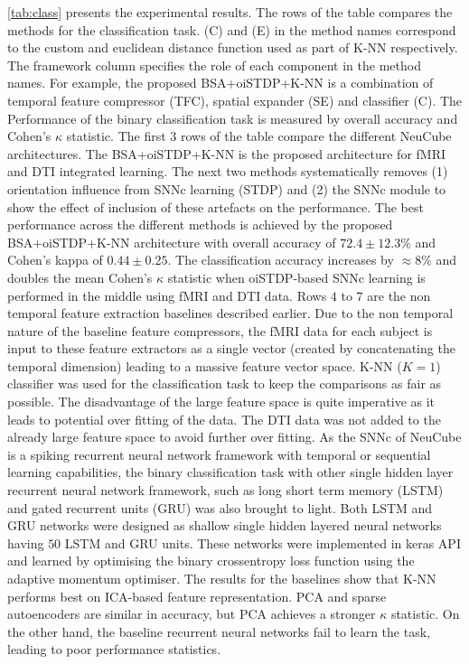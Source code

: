 \tablename \ref{tab:class} presents the experimental results. The rows of the table compares the methods for the classification task. (C) and (E) in the method names correspond to the custom and euclidean distance function used as part of K-NN respectively. The framework column specifies the role of each component in the method names. For example, the proposed BSA+oiSTDP+K-NN is a combination of temporal feature compressor (TFC), spatial expander (SE) and classifier (C). The Performance of the binary classification task is measured by overall accuracy and Cohen's $\kappa$ statistic. The first $3$ rows of the table compare the different NeuCube architectures. The BSA+oiSTDP+K-NN is the proposed architecture for fMRI and DTI integrated learning. The next two methods systematically removes (1) orientation influence from SNNc learning (STDP) and (2) the SNNc module to show the effect of inclusion of these artefacts on the performance. The best performance across the different methods is achieved by the proposed BSA+oiSTDP+K-NN architecture with overall accuracy of $72.4\pm 12.3\%$ and Cohen's kappa of $0.44\pm 0.25$. The classification accuracy increases by $\approx 8\%$ and doubles the mean Cohen's $\kappa$ statistic when oiSTDP-based SNNc learning is performed in the middle using fMRI and DTI data. Rows $4$ to $7$ are the non temporal feature extraction baselines described earlier. Due to the non temporal nature of the baseline feature compressors, the fMRI data for each subject is input to these feature extractors as a single vector (created by concatenating the temporal dimension) leading to a massive feature vector space. K-NN ($K=1$) classifier was used for the classification task to keep the comparisons as fair as possible. The disadvantage of the large feature space is quite imperative as it leads to potential over fitting of the data. The DTI data was not added to the already large feature space to avoid further over fitting. As the SNNc of NeuCube is a spiking recurrent neural network framework with temporal or sequential learning capabilities, the binary classification task with other single hidden layer recurrent neural network framework, such as long short term memory (LSTM) \citep{hochreiter1997lstm} and gated recurrent units (GRU) \citep{cho2014learning} was also brought to light. Both LSTM and GRU networks were designed as shallow single hidden layered neural networks having $50$ LSTM and GRU units. These networks were implemented in keras API \citep{chollet2015keras} and learned by optimising the binary crossentropy loss function using the adaptive momentum optimiser. The results for the baselines show that K-NN performs best on ICA-based feature representation. PCA and sparse autoencoders are similar in accuracy, but PCA achieves a stronger $\kappa$ statistic. On the other hand, the baseline recurrent neural networks fail to learn the task, leading to poor performance statistics.              

